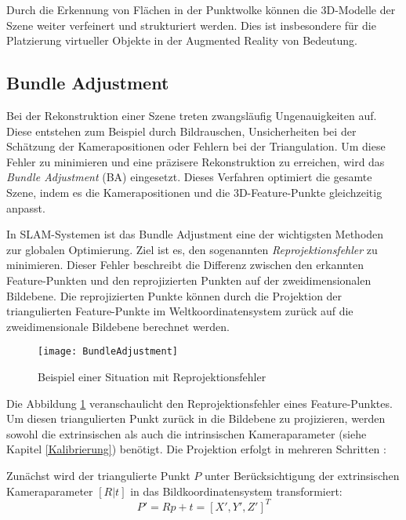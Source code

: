 Durch die Erkennung von Flächen in der Punktwolke können die 3D-Modelle der Szene weiter verfeinert und strukturiert werden. Dies ist insbesondere für die Platzierung virtueller Objekte in der Augmented Reality von Bedeutung. \cite{doerner2022virtual}

\subsection{Bundle Adjustment}

Bei der Rekonstruktion einer Szene treten zwangsläufig Ungenauigkeiten auf. Diese entstehen zum Beispiel durch Bildrauschen, Unsicherheiten bei der Schätzung der Kamerapositionen oder Fehlern bei der Triangulation. Um diese Fehler zu minimieren und eine präzisere Rekonstruktion zu erreichen, wird das \textit{Bundle Adjustment} (BA) eingesetzt. Dieses Verfahren optimiert die gesamte Szene, indem es die Kamerapositionen und die 3D-Feature-Punkte gleichzeitig anpasst. \cite{gao2021vSLAM}

In SLAM-Systemen ist das Bundle Adjustment eine der wichtigsten Methoden zur globalen Optimierung. Ziel ist es, den sogenannten \textit{Reprojektionsfehler} zu minimieren. Dieser Fehler beschreibt die Differenz zwischen den erkannten Feature-Punkten und den reprojizierten Punkten auf der zweidimensionalen Bildebene. Die reprojizierten Punkte können durch die Projektion der triangulierten Feature-Punkte im Weltkoordinatensystem zurück auf die zweidimensionale Bildebene berechnet werden. \cite{gao2021vSLAM}

\begin{figure}
    \centering
    \texttt{[image: BundleAdjustment]}
    \caption{Beispiel einer Situation mit Reprojektionsfehler \cite{kumar2024bundleAdjustment}\label{fig:BA}}\par
\end{figure}

Die Abbildung \ref{fig:BA} veranschaulicht den Reprojektionsfehler eines Feature-Punktes. Um diesen triangulierten Punkt zurück in die Bildebene zu projizieren, werden sowohl die extrinsischen als auch die intrinsischen Kameraparameter (siehe Kapitel \ref{Kalibrierung}) benötigt. Die Projektion erfolgt in mehreren Schritten \cite{gao2021vSLAM}:

Zunächst wird der triangulierte Punkt \( P \) unter Berücksichtigung der extrinsischen Kameraparameter \( [R|t] \) in das Bildkoordinatensystem transformiert:
\begin{equation}
    P' = Rp+t = [X', Y', Z']^T
\end{equation}

